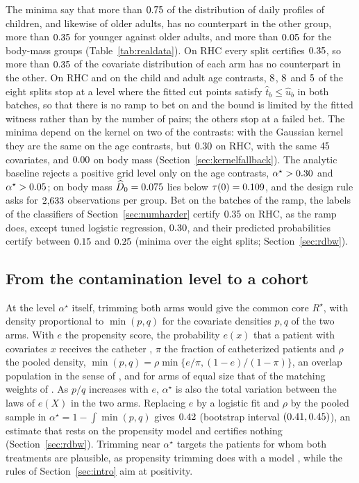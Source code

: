 The minima say that more than $0.75$ of the distribution of daily profiles of children, and likewise of older
adults, has no counterpart in the other group, more than $0.35$ for younger against older adults, and more than
$0.05$ for the body-mass groups (Table~\ref{tab:realdata}). On RHC every split certifies $0.35$, so more
than $0.35$ of the covariate distribution of each arm has no counterpart in the other. On RHC and on the child
and adult age contrasts, $8$, $8$ and $5$ of the eight splits stop at a level
where the fitted cut points satisfy $\widehat t_b\le\widehat u_b$ in both batches, so that there is no ramp to bet on
and the bound is limited by the fitted witness rather than by the number of pairs; the others stop at a failed bet.
The minima depend on the kernel on two of the contrasts: with the Gaussian kernel they are the same on the age
contrasts, but $0.30$ on RHC, with the same $45$ covariates, and $0.00$ on body
mass (Section~\ref{sec:kernelfallback}). The analytic baseline rejects a positive grid level only on the age contrasts, $\alpha^\star>0.30$ and
$\alpha^\star>0.05$; on body mass $\widehat D_0=0.075$ lies below $\tau(0)=0.109$, and the
design rule asks for $2{,}633$ observations per group. Bet on the batches of the ramp, the labels of the
classifiers of Section~\ref{sec:numharder} certify $0.35$ on RHC, as the ramp does, except tuned
logistic regression, $0.30$, and their predicted probabilities certify between
$0.15$ and $0.25$ (minima over the eight splits; Section~\ref{sec:rdbw}).

\subsection{From the contamination level to a cohort}
\label{sec:appcohort}

At the level $\alpha^\star$ itself, trimming both arms would give the common core $R^\star$, with density proportional
to $\min(p,q)$ for the covariate densities $p,q$ of the two arms. With $e$ the propensity score, the probability $e(x)$ that a patient with covariates $x$ receives the catheter
\citep{rosenbaum1983central}, $\pi$ the fraction of
catheterized patients and $\rho$ the pooled density, $\min(p,q)=\rho\min\{e/\pi,(1-e)/(1-\pi)\}$, an overlap population
in the sense of \citet{li2018balancing}, and for arms of equal size that of the matching weights of
\citet{ligreene2013matching}. As $p/q$ increases with $e$, $\alpha^\star$ is also the total variation between the laws
of $e(X)$ in the two arms. Replacing $e$ by a logistic fit and $\rho$ by the pooled sample in
$\alpha^\star=1-\int\min(p,q)$ gives $0.42$ (bootstrap interval $(0.41,0.45)$),
an estimate that rests on the propensity model and certifies nothing (Section~\ref{sec:rdbw}). Trimming near
$\alpha^\star$ targets the patients for whom both treatments are plausible, as propensity trimming does with a model
\citep{yang2018asymptotic}, while the rules of Section~\ref{sec:intro} aim at positivity.


